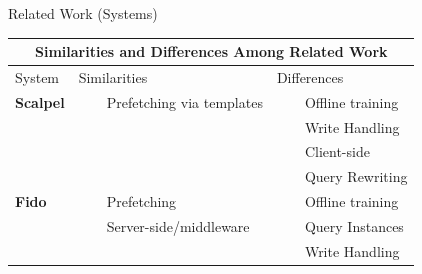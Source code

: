 \documentclass[12pt]{beamer}
\newcommand{\tabitem}{~~\llap{\textbullet}~~}
\begin{document}
\begin{frame}[fragile]{Related Work (Systems)}
\begin{table}
\centering
\begin{tabular}{lll}
\multicolumn{3}{c}{Similarities and Differences Among Related Work} \\
\toprule
System & Similarities & Differences \\
\midrule
\textbf{Scalpel} & \multicolumn{1}{p{5cm}}{\tabitem{Prefetching via templates}} & \tabitem{Offline training}  \\
& & \tabitem{Write Handling} \\
& & \tabitem{Client-side} \\
& & \tabitem{Query Rewriting} \\
\midrule
\textbf{Fido} & \tabitem{Prefetching} & \tabitem{Offline training} \\
& \tabitem{Server-side/middleware} & \tabitem{Query Instances} \\
& & \tabitem{Write Handling} \\
\midrule
\end{tabular}
\end{table}
\end{frame}

\begin{frame}[allowframebreaks]
    
    
\end{frame}
\end{document}
